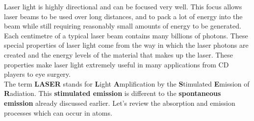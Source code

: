 Laser light is highly directional and can be focused very well. This focus allows laser beams to be used over long distances, and to pack a lot of energy into the beam while still requiring reasonably small amounts of energy to be generated. Each centimetre of a typical laser beam contains many billions of photons. 
These special properties of laser light come from the way in which the laser photons are created and the energy levels of the material that makes up the laser. These properties make laser light extremely useful in many applications from CD players to eye surgery.\\
 
The term \textbf{LASER} stands for \textbf{L}ight \textbf{A}mplification by the \textbf{S}timulated \textbf{E}mission of \textbf{R}adiation. This \textbf{stimulated emission} is different to the \textbf{spontaneous emission} already discussed earlier. Let's review the absorption and emission processes which can occur in atoms.

